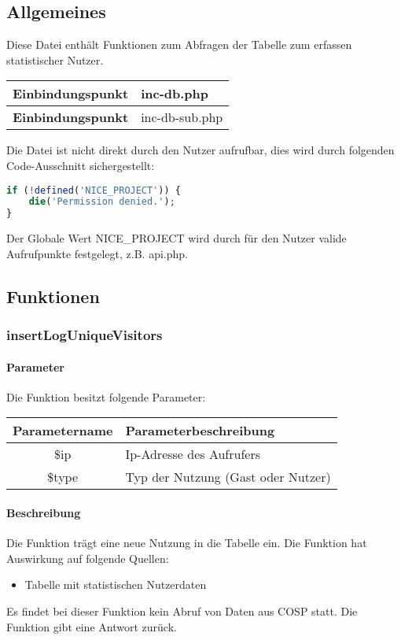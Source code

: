 \subsection{Allgemeines} Diese Datei enthält Funktionen zum Abfragen der Tabelle zum erfassen statistischer Nutzer.
\begin{table}[H]
	\begin{tabular}{|c|p{11cm}|}
		\hline
		\textbf{Einbindungspunkt} & inc-db.php \\ \hline
		\textbf{Einbindungspunkt} & inc-db-sub.php \\ \hline
	\end{tabular}
\end{table}
Die Datei ist nicht direkt durch den Nutzer aufrufbar, dies wird durch folgenden Code-Ausschnitt sichergestellt:
\begin{lstlisting}[language=php]
if (!defined('NICE_PROJECT')) {
	die('Permission denied.');
}
\end{lstlisting}
Der Globale Wert {\glqq NICE\_PROJECT\grqq} wird durch für den Nutzer valide Aufrufpunkte festgelegt, z.B. {\glqq api.php\grqq}.
\newpage
\subsection{Funktionen}
\subsubsection{insertLogUniqueVisitors}
\paragraph{Parameter} Die Funktion besitzt folgende Parameter:
\begin{table}[H]
	\begin{tabular}{|c|p{11cm}|}
		\hline
		\textbf{Parametername} & \textbf{Parameterbeschreibung} \\ \hline
		\$ip   & Ip-Adresse des Aufrufers \\ \hline
		\$type & Typ der Nutzung (Gast oder Nutzer) \\ \hline
	\end{tabular}
\end{table}
\paragraph{Beschreibung} Die Funktion trägt eine neue Nutzung in die Tabelle ein. Die Funktion hat Auswirkung auf folgende Quellen:
\begin{itemize}
	\item Tabelle mit statistischen Nutzerdaten
\end{itemize}
Es findet bei dieser Funktion kein Abruf von Daten aus {\glqq COSP\grqq} statt. Die Funktion gibt eine Antwort zurück.
